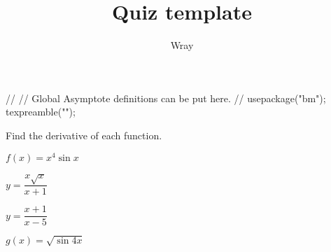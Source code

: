 \documentclass[addpoints, 12pt]{exam}
\title{Quiz template}
\author{Wray}
\begin{document}
\begin{asydef}
//
// Global Asymptote definitions can be put here.
//
usepackage("bm");
texpreamble("\def\V#1{\bm{#1}}");
\end{asydef}



\bigskip

             
\bigskip
\bigskip
Find the derivative of each function.  

\begin{questions}

\question[5]
$f(x) = x^4 \sin x$

\question[5]
$y = \dfrac{x \sqrt{x}}{x+1}$

\clearpage

\question[5]
$y = \dfrac{x + 1}{x - 5}$

\question[5]
$g(x) = \sqrt{\sin 4x}$

\end{questions}
\end{document}
